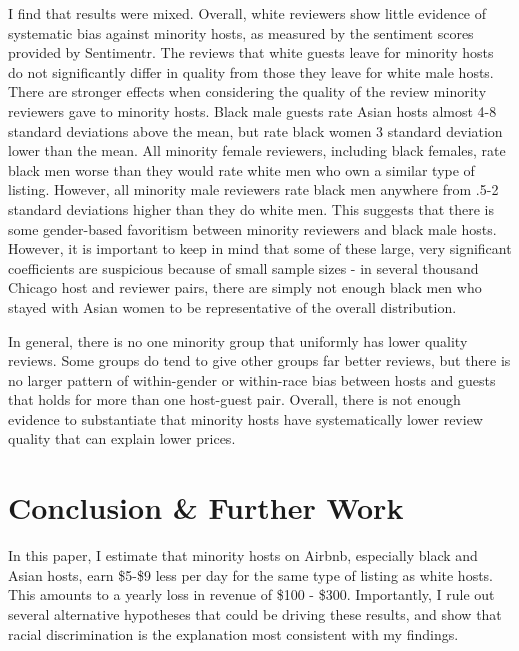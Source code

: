 \documentclass[11pt, oneside]{article}
\begin{document}
I find that results were mixed. Overall, white reviewers show little evidence of systematic bias against minority hosts, as measured by the sentiment scores provided by Sentimentr. The reviews that white guests leave for minority hosts do not significantly differ in quality from those they leave for white male hosts. There are stronger effects when considering the quality of the review minority reviewers gave to minority hosts. Black male guests rate Asian hosts almost 4-8 standard deviations above the mean, but rate black women 3 standard deviation lower than the mean. All minority female reviewers, including black females, rate black men worse than they would rate white men who own a similar type of listing. However, all minority male reviewers rate black men anywhere from .5-2 standard deviations higher than they do white men. This suggests that there is some gender-based favoritism between minority reviewers and black male hosts. However, it is important to keep in mind that some of these large, very significant coefficients are suspicious because of small sample sizes - in several thousand Chicago host and reviewer pairs, there are simply not enough black men who stayed with Asian women to be representative of the overall distribution.

In general, there is no one minority group that uniformly has lower quality reviews. Some groups do tend to give other groups far better reviews, but there is no larger pattern of within-gender or within-race bias between hosts and guests that holds for more than one host-guest pair. Overall, there is not enough evidence to substantiate that minority hosts have systematically lower review quality that can explain lower prices. 



\section{Conclusion \& Further Work}

In this paper, I estimate that minority hosts on Airbnb, especially black and Asian hosts, earn \$5-\$9 less per day for the same type of listing as white hosts. This amounts to a yearly loss in revenue of \$100 - \$300. Importantly, I rule out several alternative hypotheses that could be driving these results, and show that racial discrimination is the explanation most consistent with my findings. 
\end{document}
